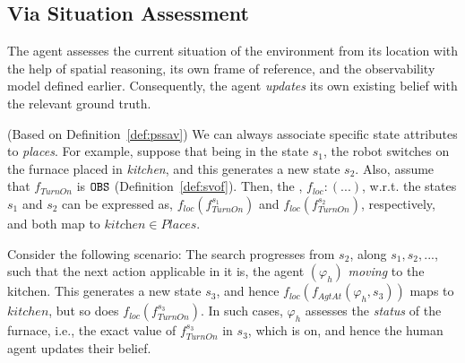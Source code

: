 \documentclass[letterpaper]{article} %
\begin{document}
\subsection{Via Situation Assessment}

The agent assesses the current situation of the environment from its location
with the help of spatial reasoning, its own frame of reference, and the observability model defined earlier. Consequently, the agent \textit{updates} its own existing belief with the relevant ground truth. 

(Based on Definition~\ref{def:pssav}) We can always associate specific state attributes to \textit{places}. 
For example, suppose that being in the state $s_1$, the robot switches on the furnace placed in \textit{kitchen}, and this generates a new state $s_2$. Also, assume that
$f_{\textit{TurnOn}}
$ is $\texttt{OBS}$ (Definition~\ref{def:svof}).   
Then, the , $f_{loc} : (...)$, w.r.t. the states
$s_1$ and 
$s_2$ can be expressed as, 
$f_{\textit{loc}} (f_{\textit{TurnOn}}^{s_1} )$ and $f_{\textit{loc}} (f_{\textit{TurnOn}}^{s_2} )$, respectively, and both map to $\textit{kitchen} \in Places$.

Consider the following scenario: The search progresses from $s_2$, along $s_1, s_2, ...$, such that the next action applicable in it is, the agent $(\varphi_h)$ \textit{moving} to the kitchen. This generates a new state $s_3$, and hence $f_{\textit{loc}} (f_{\textit{AgtAt}}(\varphi_h, s_3) )$ maps to $kitchen$, but so does  $f_{\textit{loc}} (f_{\textit{TurnOn}}^{s_3})$. 
In such cases, $\varphi_h$ assesses the \textit{status} of the furnace, i.e., the exact value of $f_{\textit{TurnOn}}^{s_3}$ in $s_3$, which is {\sc on}, and hence the human agent updates their belief.  
\end{document}
